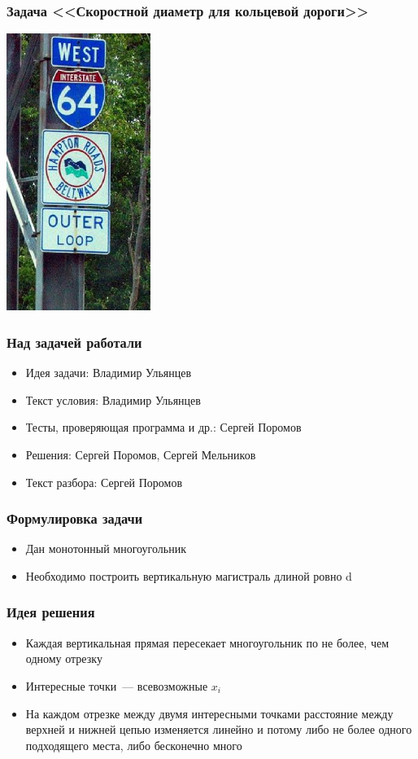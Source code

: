 \begin{frame}
  \frametitle{Задача <<Скоростной диаметр для кольцевой дороги>>}
  \begin{center}
    \includegraphics[height=9cm]{ring-11.eps}
  \end{center}
\end{frame}

\begin{frame}
  \frametitle{Над задачей работали}
  \begin{itemize}
    \item Идея задачи: Владимир Ульянцев
    \item Текст условия: Владимир Ульянцев
    \item Тесты, проверяющая программа и др.: Сергей Поромов
    \item Решения: Сергей Поромов, Сергей Мельников
    \item Текст разбора: Сергей Поромов
  \end{itemize}
\end{frame}

\begin{frame}
  \frametitle{Формулировка задачи}
  \begin{itemize}
    \item
      Дан монотонный многоугольник
    \item
      Необходимо построить вертикальную магистраль длиной ровно d
  \end{itemize}
\end{frame}

\begin{frame}
  \frametitle{Идея решения}
  \begin{itemize}
    \item Каждая вертикальная прямая пересекает многоугольник по не более, чем одному отрезку
    \item Интересные точки~--- всевозможные $x_i$
    \item На каждом отрезке между двумя интересными точками расстояние между верхней и нижней цепью изменяется линейно
          и потому либо не более одного подходящего места, либо бесконечно много
  \end{itemize}
\end{frame}

